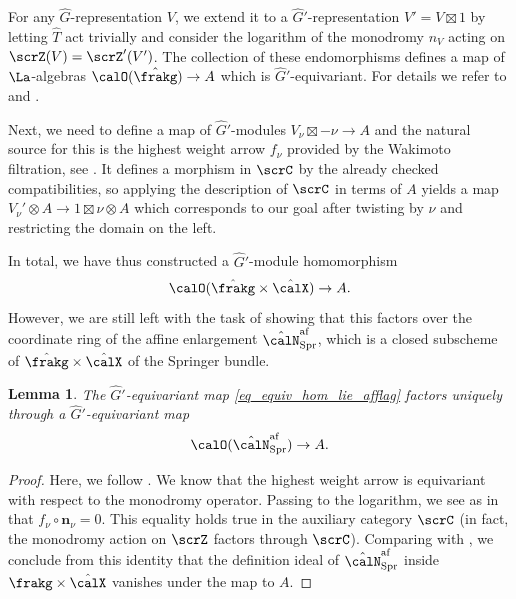 \documentclass[10pt, reqno]{amsart}
\theoremstyle{plain}
\newtheorem{lemma}[theorem]{Lemma}
\theoremstyle{definition}
\numberwithin{equation}{section}
\begin{document}
For any $\hat{G}$-representation $V$, we extend it to a $\hat{G}'$-representation $V'=V\boxtimes 1$ by letting $\hat{T}$ act trivially and consider the logarithm of the monodromy $n_V$ acting on $\scrZ(V)=\scrZ'(V')$. The collection of these endomorphisms defines a map of $\La$-algebras $\calO(\hat{\frakg}) \to A$ which is $\hat{G}'$-equivariant. For details we refer to \cite[Example 6.3.1]{AR} and .

Next, we need to define a map of $\hat{G}'$-modules $V_\nu \boxtimes -\nu\to A $ and the natural source for this is the highest weight arrow $f_\nu$ provided by the Wakimoto filtration, see . It defines a morphism in $\scrC$ by the already checked compatibilities, so applying the description of $\scrC$ in terms of $A$ yields a map $V_\nu' \otimes A \to 1\boxtimes \nu\otimes A$ which corresponds to our goal after twisting by $\nu$ and restricting the domain on the left.

In total, we have thus constructed a $\hat{G}'$-module homomorphism
\begin{equation}\label{eq_equiv_hom_lie_afflag}
	\calO(\hat{\frakg} \times \hat{\calX}) \to A.
\end{equation}
However, we are still left with the task of showing that this factors over the coordinate ring of the affine enlargement $\hat{\calN}_{\mathrm{Spr}}^{\mathrm{af}}$, which is a closed subscheme of $\hat{\frakg}\times \hat{\calX}$ of the Springer bundle.

\begin{lemma}
	The $\hat{G}'$-equivariant map \eqref{eq_equiv_hom_lie_afflag} factors uniquely through a $\hat{G}'$-equivariant map
	\begin{equation}     \calO(\hat{\calN}_{\mathrm{Spr}}^{\mathrm{af}}) \to A.
	\end{equation}
\end{lemma}

\begin{proof}
	Here, we follow \cite[Lemma 6.3.7]{AR}. We know that the highest weight arrow is equivariant with respect to the monodromy operator. Passing to the logarithm, we see as in  that $f_\nu \circ \mathbf{n}_\nu=0$. This equality holds true in the auxiliary category $\scrC$ (in fact, the monodromy action on $\scrZ$ factors through $\scrC$). 
	Comparing with \cite[Example 6.3.1]{AR}, we conclude from this identity that the definition ideal of $\hat{\calN}_{\mathrm{Spr}}^{\mathrm{af}}$ inside $\frakg \times \hat{\calX}$ vanishes under the map to $A$.
\end{proof}
\end{document}
